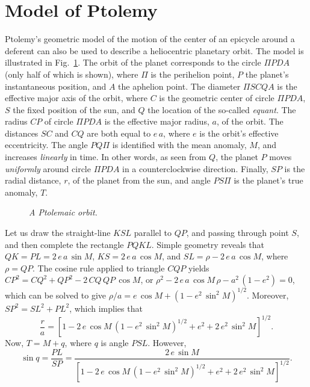 \section{Model of Ptolemy}
Ptolemy's geometric model of the motion of the center of an epicycle around a deferent can also be used to describe a heliocentric planetary orbit. The model is illustrated  in Fig.~\ref{ptol}. The orbit of the planet corresponds
to the circle $\Pi P D A$ (only half of which is shown), where $\Pi$ is the perihelion point, $P$ the planet's instantaneous position,
and $A$ the aphelion point. The diameter $\Pi   S C Q A$ is the effective major axis of the orbit, where $C$ is the geometric center of circle $\Pi P D A$,  $S$ the fixed position of the sun, and $Q$  the location of the so-called {\em equant}.
The radius $CP$ of circle $\Pi PDA$ is   the effective major radius, $a$, of the orbit.  The distances $SC$ and $CQ$ are both
equal to $e\,a$, where $e$ is the orbit's effective eccentricity. The angle $PQ\Pi$
is  identified with the  mean anomaly, $M$, and increases {\em linearly}\/  in time.  In other words, as seen from $Q$, the planet
$P$ moves {\em uniformly}\/ around circle $\Pi PDA$ in a counterclockwise direction. Finally, $SP$ is the radial
distance, $r$, of the planet from the sun, and angle $P S \Pi$ is the planet's true anomaly, $T$.

\begin{figure}[h]
\epsfysize=3in
\centerline{}
\caption{\em A Ptolemaic orbit.}\label{ptol}
\end{figure}

Let us draw the straight-line $KSL$ parallel to $QP$, and passing through point $S$, and then complete the rectangle $PQKL$. Simple geometry reveals that 
$QK = PL = 2\,e\,a\,\sin M$, $KS=2\,e\,a\,\cos M$, and  $SL = \rho-2\,e\,a\,\cos M$, where
$\rho=QP$. The cosine rule applied to triangle $CQP$ yields
$CP^2 = CQ^2+QP^2-2\,CQ\,QP\,\cos M$, or $\rho^2-2\,e\,a\,\cos M\,\rho -a^2\,(1-e^2)=0$, which
can be solved to give $\rho/a = e\,\cos M +(1-e^2\,\sin^2 M)^{1/2}$. 
 Moreover, $SP^2 = SL^2+ PL^2$,
which implies that
\begin{equation}\label{e4.30x}
\frac{r}{a} = [1-2\,e\,\cos M\,(1-e^2\,\sin^2 M)^{1/2}+e^2+2\,e^2\,\sin^2 M]^{1/2}.
\end{equation}
Now, $T = M + q$, where $q$ is angle $PSL$. However,
\begin{equation}\label{e4.31x}
\sin q = \frac{PL}{SP} = \frac{2\,e\,\sin M}{[1-2\,e\,\cos M\,(1-e^2\,\sin^2 M)^{1/2}+e^2+2\,e^2\,\sin^2 M]^{1/2}}.
\end{equation}


